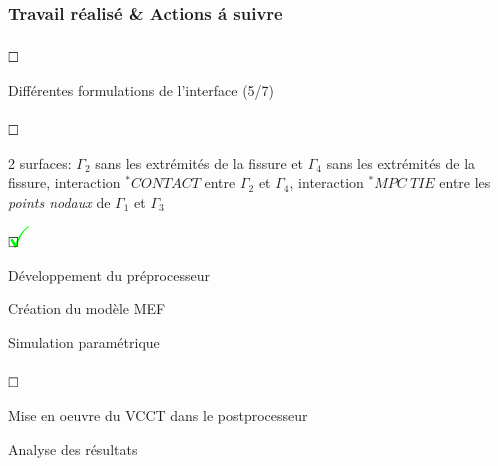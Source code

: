 \documentclass[first,firstsupp,lastsupp,handout,last,hyperref,table]{ETHclass}
\begin{document}
\begin{frame}
\frametitle{Travail r\'ealis\'e \& Actions \'a suivre}
\vspace{-0.5cm}
\scriptsize
\begin{list}{$\text{\rlap{\textcolor{white}{\huge$\mathbf{\checkmark}$}}}\square$}{}  
\item Diff\'erentes formulations de l'interface (5/7)
\begin{list}{$\text{\rlap{\textcolor{white}{\huge$\mathbf{\checkmark}$}}}\square$}{}  
\item  2 surfaces: $\Gamma_{2}$ sans les extr\'emit\'es de la fissure et $\Gamma_{4}$ sans les extr\'emit\'es de la fissure, interaction $^{*}CONTACT$ entre  $\Gamma_{2}$ et $\Gamma_{4}$, interaction $^{*}MPC\ TIE$ entre les \textit{points nodaux} de $\Gamma_{1}$ et $\Gamma_{3}$
\begin{list}{$\text{\rlap{\textcolor{green}{\huge$\mathbf{\checkmark}$}}}\square$}{}
\item D\'eveloppement du pr\'eprocesseur
\item Cr\'eation du mod\`ele MEF
\item Simulation param\'etrique
\end{list}
\begin{list}{$\text{\rlap{\textcolor{white}{\huge$\mathbf{\checkmark}$}}}\square$}{}  
\item Mise en oeuvre du VCCT dans le postprocesseur
\item Analyse des r\'esultats
\end{list}
\end{list}
\end{list}
\end{frame}
\end{document}
